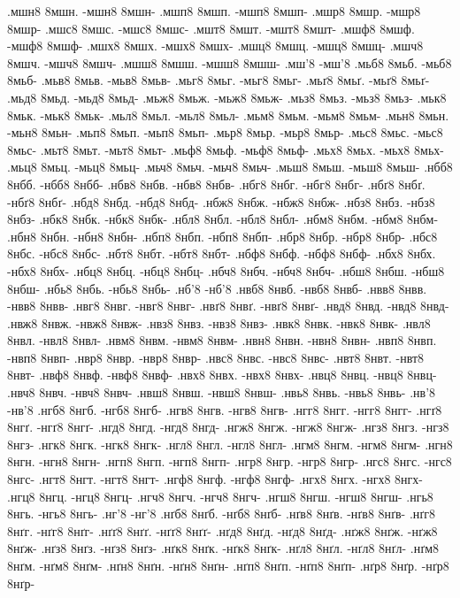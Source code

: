{.мшн8 8мшн. -мшн8 8мшн-
.мшп8 8мшп. -мшп8 8мшп-
.мшр8 8мшр. -мшр8 8мшр-
.мшс8 8мшс. -мшс8 8мшс-
.мшт8 8мшт. -мшт8 8мшт-
.мшф8 8мшф. -мшф8 8мшф-
.мшх8 8мшх. -мшх8 8мшх-
.мшц8 8мшц. -мшц8 8мшц-
.мшч8 8мшч. -мшч8 8мшч-
.мшш8 8мшш. -мшш8 8мшш-
.мш'8 -мш'8
.мьб8 8мьб. -мьб8 8мьб-
.мьв8 8мьв. -мьв8 8мьв-
.мьг8 8мьг. -мьг8 8мьг-
.мьґ8 8мьґ. -мьґ8 8мьґ-
.мьд8 8мьд. -мьд8 8мьд-
.мьж8 8мьж. -мьж8 8мьж-
.мьз8 8мьз. -мьз8 8мьз-
.мьк8 8мьк. -мьк8 8мьк-
.мьл8 8мьл. -мьл8 8мьл-
.мьм8 8мьм. -мьм8 8мьм-
.мьн8 8мьн. -мьн8 8мьн-
.мьп8 8мьп. -мьп8 8мьп-
.мьр8 8мьр. -мьр8 8мьр-
.мьс8 8мьс. -мьс8 8мьс-
.мьт8 8мьт. -мьт8 8мьт-
.мьф8 8мьф. -мьф8 8мьф-
.мьх8 8мьх. -мьх8 8мьх-
.мьц8 8мьц. -мьц8 8мьц-
.мьч8 8мьч. -мьч8 8мьч-
.мьш8 8мьш. -мьш8 8мьш-
.нбб8 8нбб. -нбб8 8нбб-
.нбв8 8нбв. -нбв8 8нбв-
.нбг8 8нбг. -нбг8 8нбг-
.нбґ8 8нбґ. -нбґ8 8нбґ-
.нбд8 8нбд. -нбд8 8нбд-
.нбж8 8нбж. -нбж8 8нбж-
.нбз8 8нбз. -нбз8 8нбз-
.нбк8 8нбк. -нбк8 8нбк-
.нбл8 8нбл. -нбл8 8нбл-
.нбм8 8нбм. -нбм8 8нбм-
.нбн8 8нбн. -нбн8 8нбн-
.нбп8 8нбп. -нбп8 8нбп-
.нбр8 8нбр. -нбр8 8нбр-
.нбс8 8нбс. -нбс8 8нбс-
.нбт8 8нбт. -нбт8 8нбт-
.нбф8 8нбф. -нбф8 8нбф-
.нбх8 8нбх. -нбх8 8нбх-
.нбц8 8нбц. -нбц8 8нбц-
.нбч8 8нбч. -нбч8 8нбч-
.нбш8 8нбш. -нбш8 8нбш-
.нбь8 8нбь. -нбь8 8нбь-
.нб'8 -нб'8
.нвб8 8нвб. -нвб8 8нвб-
.нвв8 8нвв. -нвв8 8нвв-
.нвг8 8нвг. -нвг8 8нвг-
.нвґ8 8нвґ. -нвґ8 8нвґ-
.нвд8 8нвд. -нвд8 8нвд-
.нвж8 8нвж. -нвж8 8нвж-
.нвз8 8нвз. -нвз8 8нвз-
.нвк8 8нвк. -нвк8 8нвк-
.нвл8 8нвл. -нвл8 8нвл-
.нвм8 8нвм. -нвм8 8нвм-
.нвн8 8нвн. -нвн8 8нвн-
.нвп8 8нвп. -нвп8 8нвп-
.нвр8 8нвр. -нвр8 8нвр-
.нвс8 8нвс. -нвс8 8нвс-
.нвт8 8нвт. -нвт8 8нвт-
.нвф8 8нвф. -нвф8 8нвф-
.нвх8 8нвх. -нвх8 8нвх-
.нвц8 8нвц. -нвц8 8нвц-
.нвч8 8нвч. -нвч8 8нвч-
.нвш8 8нвш. -нвш8 8нвш-
.нвь8 8нвь. -нвь8 8нвь-
.нв'8 -нв'8
.нгб8 8нгб. -нгб8 8нгб-
.нгв8 8нгв. -нгв8 8нгв-
.нгг8 8нгг. -нгг8 8нгг-
.нгґ8 8нгґ. -нгґ8 8нгґ-
.нгд8 8нгд. -нгд8 8нгд-
.нгж8 8нгж. -нгж8 8нгж-
.нгз8 8нгз. -нгз8 8нгз-
.нгк8 8нгк. -нгк8 8нгк-
.нгл8 8нгл. -нгл8 8нгл-
.нгм8 8нгм. -нгм8 8нгм-
.нгн8 8нгн. -нгн8 8нгн-
.нгп8 8нгп. -нгп8 8нгп-
.нгр8 8нгр. -нгр8 8нгр-
.нгс8 8нгс. -нгс8 8нгс-
.нгт8 8нгт. -нгт8 8нгт-
.нгф8 8нгф. -нгф8 8нгф-
.нгх8 8нгх. -нгх8 8нгх-
.нгц8 8нгц. -нгц8 8нгц-
.нгч8 8нгч. -нгч8 8нгч-
.нгш8 8нгш. -нгш8 8нгш-
.нгь8 8нгь. -нгь8 8нгь-
.нг'8 -нг'8
.нґб8 8нґб. -нґб8 8нґб-
.нґв8 8нґв. -нґв8 8нґв-
.нґг8 8нґг. -нґг8 8нґг-
.нґґ8 8нґґ. -нґґ8 8нґґ-
.нґд8 8нґд. -нґд8 8нґд-
.нґж8 8нґж. -нґж8 8нґж-
.нґз8 8нґз. -нґз8 8нґз-
.нґк8 8нґк. -нґк8 8нґк-
.нґл8 8нґл. -нґл8 8нґл-
.нґм8 8нґм. -нґм8 8нґм-
.нґн8 8нґн. -нґн8 8нґн-
.нґп8 8нґп. -нґп8 8нґп-
.нґр8 8нґр. -нґр8 8нґр-
}
